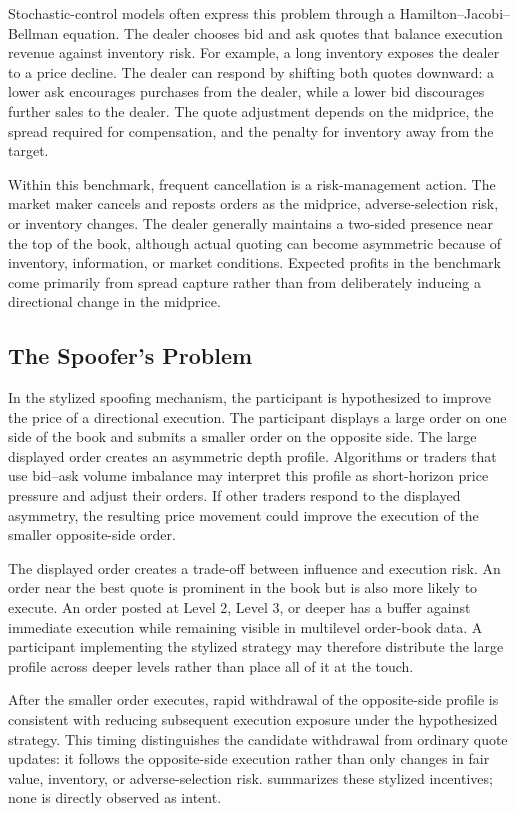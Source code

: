 \documentclass[11pt]{article}
\begin{document}
Stochastic-control models often express this problem through a Hamilton--Jacobi--Bellman equation. The dealer chooses bid
and ask quotes that balance execution revenue against inventory risk. For example, a long inventory exposes the dealer to
a price decline. The dealer can respond by shifting both quotes downward: a lower ask encourages purchases from the
dealer, while a lower bid discourages further sales to the dealer. The quote adjustment depends on the midprice, the
spread required for compensation, and the penalty for inventory away from the target.

Within this benchmark, frequent cancellation is a risk-management action. The market maker cancels and reposts orders as
the midprice, adverse-selection risk, or inventory changes. The dealer generally maintains a two-sided presence near the
top of the book, although actual quoting can become asymmetric because of inventory, information, or market conditions.
Expected profits in the benchmark come primarily from spread capture rather than from deliberately inducing a directional
change in the midprice.

\subsection{The Spoofer's Problem}
\label{subsec:spoofing}
In the stylized spoofing mechanism, the participant is hypothesized to improve the price of a directional execution.
The participant displays a large order on one side of the book and submits a smaller order on the opposite side. The large
displayed order creates an asymmetric depth profile. Algorithms or traders that use bid--ask volume imbalance may interpret
this profile as short-horizon price pressure and adjust their orders. If other traders respond to the displayed asymmetry,
the resulting price movement could improve the execution of the smaller opposite-side order.

The displayed order creates a trade-off between influence and execution risk. An order near the best quote is prominent
in the book but is also more likely to execute. An order posted at Level 2, Level 3, or deeper has a buffer against
immediate execution while remaining visible in multilevel order-book data. A participant implementing the stylized
strategy may therefore distribute the large profile across deeper levels rather than place all of it at the touch.

After the smaller order executes, rapid withdrawal of the opposite-side profile is consistent with reducing subsequent
execution exposure under the hypothesized strategy. This timing distinguishes the candidate withdrawal from ordinary quote
updates: it follows the opposite-side execution rather than only changes in fair value, inventory, or adverse-selection risk.
 summarizes these stylized incentives; none is directly observed as intent.
\end{document}
